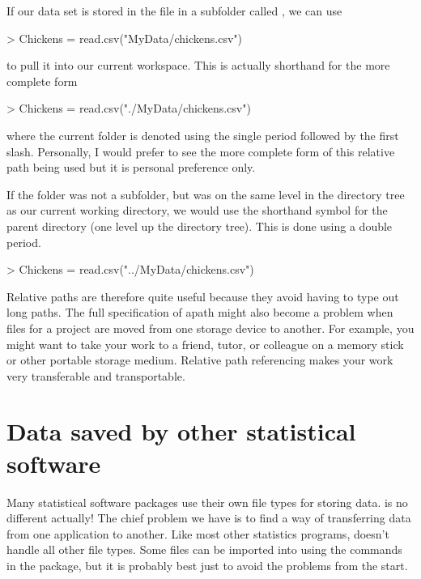 If our data set is stored in the file  in a  subfolder called , we can use 
\begin{Schunk}
\begin{Sinput}
> Chickens = read.csv("MyData/chickens.csv")
\end{Sinput}
\end{Schunk}
to pull it into our current workspace. This is actually shorthand for the more complete form
\begin{Schunk}
\begin{Sinput}
> Chickens = read.csv("./MyData/chickens.csv")
\end{Sinput}
\end{Schunk}
where the current folder is denoted using the single period followed by the first slash. Personally, I would prefer to see the more complete form of this relative path being used but it is personal preference only.

If the  folder was not a subfolder, but was on the same level in the directory tree as our current working directory, we would use the shorthand symbol for the parent directory (one level up the directory tree). This is done using  a double period.
\begin{Schunk}
\begin{Sinput}
> Chickens = read.csv("../MyData/chickens.csv")
\end{Sinput}
\end{Schunk}

Relative paths are therefore quite useful because they avoid having to type out long paths. The full specification of apath might also become a problem when files for a project are moved from one storage device to another. For example, you might want to take your work to a friend, tutor, or colleague on a  memory stick or other portable storage medium. Relative path referencing makes your work very transferable and transportable.






\section{Data saved by other statistical software}

Many statistical software packages use their own file types for storing data. \R{} is no different actually! The chief problem we have is to find a way of transferring data from one application to another. Like most other statistics programs, \R{} doesn't handle all other file types. Some files can be imported into \R{} using the commands in the  package, but it is probably best just to avoid the problems from the start.

